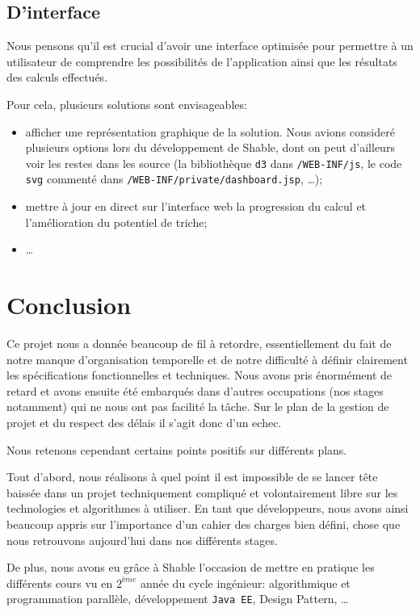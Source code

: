 \documentclass[11pt,a4paper, openany]{book}
\begin{document}
\section{D'interface}

Nous pensons qu'il est crucial d'avoir une interface optimisée pour permettre à un utilisateur de comprendre les possibilités de l'application ainsi que les résultats des calculs effectués.

Pour cela, plusieurs solutions sont envisageables:

\begin{itemize}
\item afficher une représentation graphique de la solution. Nous avions consideré plusieurs options lors du développement de Shable, dont on peut d'ailleurs voir les restes dans les source (la bibliothèque \texttt{d3} dans \texttt{/WEB-INF/js}, le code \texttt{svg} commenté dans \texttt{/WEB-INF/private/dashboard.jsp}, \dots);
\item mettre à jour en direct sur l'interface web la progression du calcul et l'amélioration du potentiel de triche;
\item \dots
\end{itemize}

\chapter*{Conclusion}

Ce projet nous a donnée beaucoup de fil à retordre, essentiellement du fait de notre manque d'organisation temporelle et de notre difficulté à définir clairement les spécifications fonctionnelles et techniques. Nous avons pris énormément de retard et avons ensuite été embarqués dans d'autres occupations (nos stages notamment) qui ne nous ont pas facilité la tâche. Sur le plan de la gestion de projet et du respect des délais il s'agit donc d'un echec.

Nous retenons cependant certains points positifs sur différents plans. 

Tout d'abord, nous réalisons à quel point il est impossible de se lancer tête baissée dans un projet techniquement compliqué et volontairement libre sur les technologies et algorithmes à utiliser. En tant que développeurs, nous avons ainsi beaucoup appris sur l'importance d'un cahier des charges bien défini, chose que nous retrouvons aujourd'hui dans nos différents stages.

De plus, nous avons eu grâce à Shable l'occasion de mettre en pratique les différents cours vu en $2^{ème}$ année du cycle ingénieur: algorithmique et programmation parallèle, développement \texttt{Java EE}, Design Pattern, \dots
\end{document}
